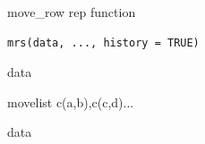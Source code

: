 \documentclass[a4paper]{book}
\begin{document}
%
\begin{Description}
move\_row rep function
\end{Description}
%
\begin{Usage}
\begin{verbatim}
mrs(data, ..., history = TRUE)
\end{verbatim}
\end{Usage}
%
\begin{Arguments}
\begin{ldescription}
\item[\code{data}] data

\item[\code{...}] movelist c(a,b),c(c,d)...
\end{ldescription}
\end{Arguments}
%
\begin{Value}
data
\end{Value}
%
\end{document}
